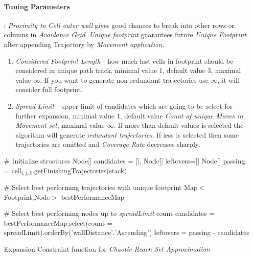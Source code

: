 \paragraph{Tuning Parameters}: \emph{Proximity to Cell outer wall} gives good chances to break into other rows or columns in \emph{Avoidance Grid}. \emph{Unique footprint} guarantees future \emph{Unique Footprint} after appending Trajectory by \emph{Movement application}. 
\begin{enumerate}
    \item \emph{Considered Footprint Length} - how much last cells in footprint should be considered in unique path track, minimal value 1, default value 3, maximal value $\infty$. If you want to generate non redundant trajectories use $\infty$, it will consider full footprint.
    
    \item \emph{Spread Limit} - upper limit of candidates which are going to be select for further expansion, minimal value 1, default value \emph{Count of unique Moves in Movement set}, maximal value $\infty$. If more than default values is selected the algorithm will generate \emph{redundant trajectories}. If less is selected then some trajectories are omitted and \emph{Coverage Rate} decreases sharply. 
\end{enumerate}

\begin{algorithm}[H]
    
    \BlankLine
    \# Initialize structures\;
    Node[] candidates = [], Node[] leftovers=[]\;
    Node[] passing = cell$_{i,j,k}$.getFinishingTrajectories(stack)\;
    
    \BlankLine
    \# Select best performing trajectories with unique footprint\;
    Map$<$Footprint,Node$>$  bestPerformanceMap\;
    \For{Node test $\in$ passing}{
        wallDistance= test.minimalDistanceToWall(cell$_{i,j,k}$)]\;
        footPrint = test.getFootprint(lastCells = footprintLength)\;
        \eIf{bestPerformanceMap.contains(footPrint)}{
            old = bestPerformanceMap.getByKey(footprint)\;
            oldPerformance= old.minimalDistanceToWall(cell$_{i,j,k}$)\;
            \If{oldPerformance $>$ wallDistance}{
                bestPerformanceMap.setByKey(footprint,test)\;         
            }
        }{
            bestPerformanceMap.setByKey(footprint,test)\;
        }
    }
    
    \BlankLine
    \# Select best performing nodes up to \emph{spreadLimit} count\;
    candidates = bestPerformanceMap.select(count = spreadLimit).orderBy('wallDistance','Ascending')\;
    leftovers = passing - candidates\;
    
    
    \caption{Expansion Constraint function for \emph{Chaotic Reach Set Approximation}}
    \label{alg:ExpansionConstraintFunctionForChaoticReachSet}
\end{algorithm}


